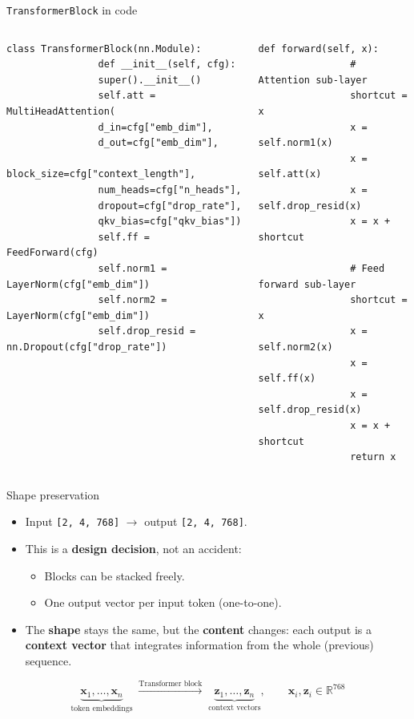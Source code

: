 \documentclass[aspectratio=169]{beamer}
\begin{document}
	\begin{frame}[fragile]{\texttt{TransformerBlock} in code}
		\begin{columns}[T]
			\begin{lstlisting}[basicstyle=\ttfamily\tiny]
				class TransformerBlock(nn.Module):
				def __init__(self, cfg):
				super().__init__()
				self.att = MultiHeadAttention(
				d_in=cfg["emb_dim"],
				d_out=cfg["emb_dim"],
				block_size=cfg["context_length"],
				num_heads=cfg["n_heads"],
				dropout=cfg["drop_rate"],
				qkv_bias=cfg["qkv_bias"])
				self.ff = FeedForward(cfg)
				self.norm1 = LayerNorm(cfg["emb_dim"])
				self.norm2 = LayerNorm(cfg["emb_dim"])
				self.drop_resid = nn.Dropout(cfg["drop_rate"])
			\end{lstlisting}
			\begin{lstlisting}[basicstyle=\ttfamily\tiny]
				def forward(self, x):
				# Attention sub-layer
				shortcut = x
				x = self.norm1(x)
				x = self.att(x)
				x = self.drop_resid(x)
				x = x + shortcut
				
				# Feed forward sub-layer
				shortcut = x
				x = self.norm2(x)
				x = self.ff(x)
				x = self.drop_resid(x)
				x = x + shortcut
				return x
			\end{lstlisting}
		\end{columns}
	\end{frame}
	
	\begin{frame}{Shape preservation}
		\begin{itemize}
			\item Input \texttt{[2, 4, 768]} $\to$ output \texttt{[2, 4, 768]}.
			\item This is a \textbf{design decision}, not an accident:
			\begin{itemize}
				\item Blocks can be stacked freely.
				\item One output vector per input token (one-to-one).
			\end{itemize}
			\item The \textbf{shape} stays the same, but the \textbf{content} changes: each output is a \textbf{context vector} that integrates information from the whole (previous) sequence.
		\end{itemize}
		\begin{equation*}
			\underbrace{\mathbf{x}_1,\dots,\mathbf{x}_n}_{\text{token embeddings}}
			\;\xrightarrow{\text{Transformer block}}\;
			\underbrace{\mathbf{z}_1,\dots,\mathbf{z}_n}_{\text{context vectors}},
			\qquad \mathbf{x}_i,\mathbf{z}_i \in \mathbb{R}^{768}
		\end{equation*}
	\end{frame}
	
\end{document}
